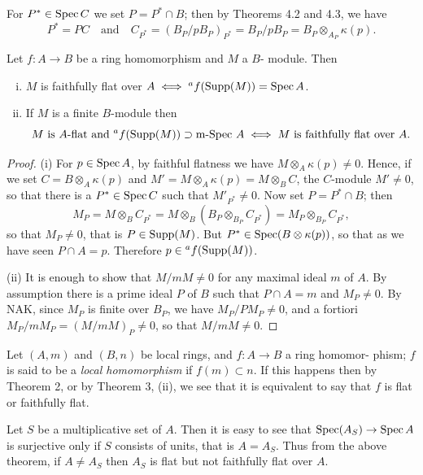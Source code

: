 For $P^* \in \operatorname{Spec} C$ we set $P = P^* \cap B$; then by Theorems 4.2 and 4.3, we have
\[
  P^* = PC \quad \text{and} \quad C_{P^*} = (B_P/pB_P)_{P^*} = B_P/pB_P = B_P \otimes_{A_P} \kappa(p).
\]

\begin{theorem}\label{thm:7.3}
Let $f\colon A \to B$ be a ring homomorphism and $M$ a $B$-
module. Then
\begin{enumerate}[(i)]
  \item $M$ is faithfully flat over $A \iff {}^a f(\operatorname{Supp}(M)) = \operatorname{Spec} A$.
  \item If $M$ is a finite $B$-module then
        \[
          M \text{ is $A$-flat and } {}^a f(\operatorname{Supp}(M)) \supset \text{m-Spec } A \iff M \text{ is faithfully flat over } A.
        \]
\end{enumerate}
\end{theorem}

\begin{proof}
(i) For $p \in \operatorname{Spec} A$, by faithful flatness we have $M \otimes_A \kappa(p) \neq 0$. Hence,
if we set $C = B \otimes_A \kappa(p)$ and $M' = M \otimes_A \kappa(p) = M \otimes_B C$, the $C$-module
$M' \neq 0$, so that there is a $P^* \in \operatorname{Spec} C$ such that $M'_{P^*} \neq 0$. Now set
$P = P^* \cap B$; then
\[
  M_P = M \otimes_B C_{P^*} = M \otimes_B (B_P \otimes_{B_P} C_{P^*}) = M_P \otimes_{B_P} C_{P^*},
\]
so that $M_P \neq 0$, that is $P \in \operatorname{Supp}(M)$. But $P^* \in \operatorname{Spec}(B \otimes \kappa(p))$, so that as
we have seen $P \cap A = p$. Therefore $p \in {}^a f(\operatorname{Supp}(M))$.

(ii) It is enough to show that $M/mM \neq 0$ for any maximal ideal $m$ of $A$. By
assumption there is a prime ideal $P$ of $B$ such that $P \cap A = m$ and
$M_P \neq 0$. By NAK, since $M_P$ is finite over $B_P$, we have $M_P/PM_P \neq 0$, and
a fortiori $M_P/mM_P = (M/mM)_P \neq 0$, so that $M/mM \neq 0$.
\end{proof}

Let $(A, m)$ and $(B, n)$ be local rings, and $f\colon A \to B$ a ring homomor-
phism; $f$ is said to be a \emph{local homomorphism} if $f(m) \subset n$. If this happens then
by Theorem 2, or by Theorem 3, (ii), we see that it is equivalent to say that $f$
is flat or faithfully flat.

Let $S$ be a multiplicative set of $A$. Then it is easy to see that $\operatorname{Spec}(A_S)
\to \operatorname{Spec} A$ is surjective only if $S$ consists of units, that is $A = A_S$. Thus
from the above theorem, if $A \neq A_S$ then $A_S$ is flat but not faithfully flat over
$A$.

